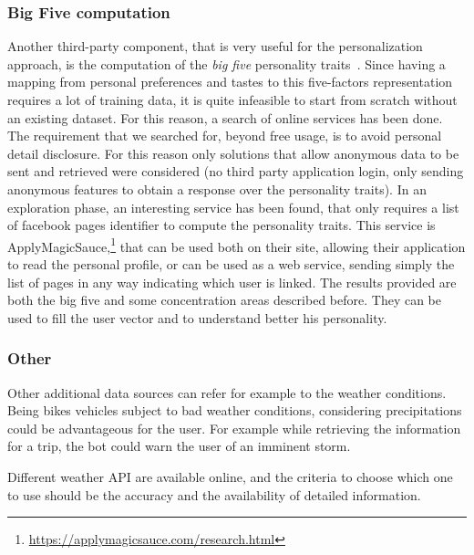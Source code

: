 \subsubsection{Big Five computation}
\label{approachIRbig5}

Another third-party component, that is very useful for the personalization approach, is the computation of the \textit{big five} personality traits~\cite{goldberg1993structure}. Since having a mapping from personal preferences and tastes to this five-factors representation requires a lot of training data, it is quite infeasible to start from scratch without an existing dataset. For this reason, a search of online services has been done. The requirement that we searched for, beyond free usage, is to avoid personal detail disclosure. For this reason only solutions that allow anonymous data to be sent and retrieved were considered (no third party application login, only sending anonymous features to obtain a response over the personality traits). In an exploration phase, an interesting service has been found, that only requires a list of facebook pages identifier to compute the personality traits. This service is ApplyMagicSauce,\footnote{\url{https://applymagicsauce.com/research.html}} that can be used both on their site, allowing their application to read the personal profile, or can be used as a web service, sending simply the list of pages in any way indicating which user is linked. The results provided are both the big five and some concentration areas described before. They can be used to fill the user vector and to understand better his personality.

\subsubsection{Other}
Other additional data sources can refer for example to the weather conditions. Being bikes vehicles subject to bad weather conditions, considering precipitations could be advantageous for the user. For example while retrieving the information for a trip, the bot could warn the user of an imminent storm.

Different weather API are available online, and the criteria to choose which one to use should be the accuracy and the availability of detailed information.


